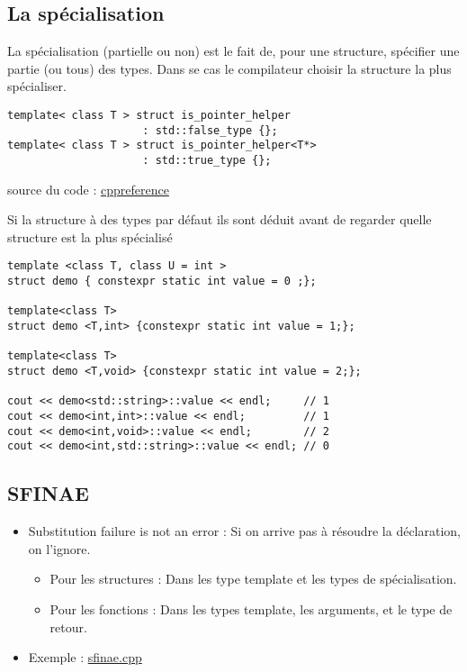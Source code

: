 \documentclass{beamer}
\begin{document}
\subsection{La spécialisation}

\begin{frame}[containsverbatim]
	La spécialisation (partielle ou non) est le fait de, pour une structure, spécifier une partie (ou tous) des types. Dans se cas le compilateur choisir la structure la plus spécialiser.\\
	
	\begin{lstlisting}
template< class T > struct is_pointer_helper    
                     : std::false_type {};
template< class T > struct is_pointer_helper<T*> 
                     : std::true_type {};
	\end{lstlisting}
	source du code : \href{http://en.cppreference.com/w/cpp/types/is_pointer}{cppreference}
\end{frame}

\begin{frame}[containsverbatim]
	Si la structure à des types par défaut ils sont déduit avant de regarder quelle structure est la plus spécialisé
	\begin{lstlisting}
template <class T, class U = int >
struct demo { constexpr static int value = 0 ;};

template<class T>
struct demo <T,int> {constexpr static int value = 1;};

template<class T>
struct demo <T,void> {constexpr static int value = 2;};

cout << demo<std::string>::value << endl;     // 1
cout << demo<int,int>::value << endl;         // 1
cout << demo<int,void>::value << endl;        // 2
cout << demo<int,std::string>::value << endl; // 0
	\end{lstlisting}
	
\end{frame}

\subsection{SFINAE}
\begin{frame}[containsverbatim]

	\begin{itemize}
		\item Substitution failure is not an error : Si on arrive pas à résoudre la déclaration, on l'ignore.
		\begin{itemize}
			\item Pour les structures : Dans les type template et les types de spécialisation.
			\item Pour les fonctions : Dans les types template, les arguments, et le type de retour.
		\end{itemize}
		\item Exemple : \href{run:../code_demo/sfinae.cpp}{sfinae.cpp}
	\end{itemize}

	
\end{frame}
\end{document}
